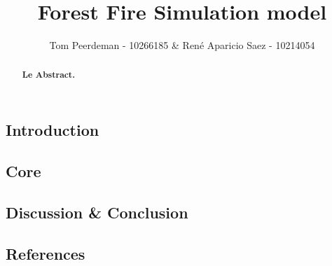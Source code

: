 \documentclass{article}
\title{Forest Fire Simulation model}
\author{Tom Peerdeman - 10266185 \& Ren\'e Aparicio Saez - 10214054}
\begin{document}
\maketitle

\begin{abstract}
\textbf{Le Abstract.}
\end{abstract}

\begin{multicols}{2}
\subsection*{Introduction}

\subsection*{Core}

\subsection*{Discussion \& Conclusion}

\subsection*{References}
\end{multicols}
\newpage


\end{document}
